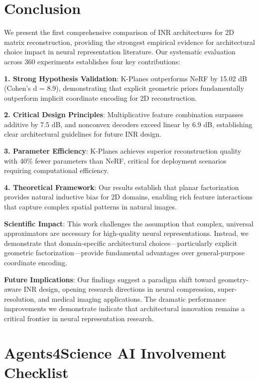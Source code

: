 \documentclass{article}
\begin{document}
\section{Conclusion}

We present the first comprehensive comparison of INR architectures for 2D matrix reconstruction, providing the strongest empirical evidence for architectural choice impact in neural representation literature. Our systematic evaluation across 360 experiments establishes four key contributions:

\textbf{1. Strong Hypothesis Validation}: K-Planes outperforms NeRF by 15.02 dB (Cohen's d = 8.9), demonstrating that explicit geometric priors fundamentally outperform implicit coordinate encoding for 2D reconstruction.

\textbf{2. Critical Design Principles}: Multiplicative feature combination surpasses additive by 7.5 dB, and nonconvex decoders exceed linear by 6.9 dB, establishing clear architectural guidelines for future INR design.

\textbf{3. Parameter Efficiency}: K-Planes achieves superior reconstruction quality with 40\% fewer parameters than NeRF, critical for deployment scenarios requiring computational efficiency.

\textbf{4. Theoretical Framework}: Our results establish that planar factorization provides natural inductive bias for 2D domains, enabling rich feature interactions that capture complex spatial patterns in natural images.

\textbf{Scientific Impact}: This work challenges the assumption that complex, universal approximators are necessary for high-quality neural representations. Instead, we demonstrate that domain-specific architectural choices—particularly explicit geometric factorization—provide fundamental advantages over general-purpose coordinate encoding.

\textbf{Future Implications}: Our findings suggest a paradigm shift toward geometry-aware INR design, opening research directions in neural compression, super-resolution, and medical imaging applications. The dramatic performance improvements we demonstrate indicate that architectural innovation remains a critical frontier in neural representation research.

\small



\newpage
\section*{Agents4Science AI Involvement Checklist}
\end{document}
